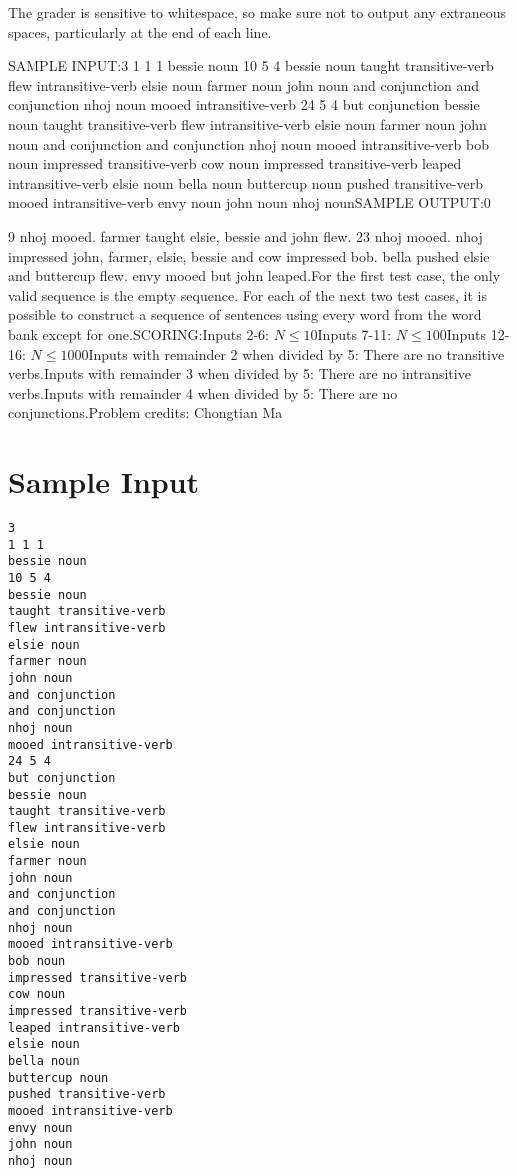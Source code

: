 \documentclass[12pt]{article}
\begin{document}
The grader is sensitive to whitespace, so make sure not to output any
extraneous spaces, particularly at the end of each line.

SAMPLE INPUT:3
1 1 1
bessie noun
10 5 4
bessie noun
taught transitive-verb
flew intransitive-verb
elsie noun
farmer noun
john noun
and conjunction
and conjunction
nhoj noun
mooed intransitive-verb
24 5 4
but conjunction
bessie noun
taught transitive-verb
flew intransitive-verb
elsie noun
farmer noun
john noun
and conjunction
and conjunction
nhoj noun
mooed intransitive-verb
bob noun
impressed transitive-verb
cow noun
impressed transitive-verb
leaped intransitive-verb
elsie noun
bella noun
buttercup noun
pushed transitive-verb
mooed intransitive-verb
envy noun
john noun
nhoj nounSAMPLE OUTPUT:0

9
nhoj mooed. farmer taught elsie, bessie and john flew.
23
nhoj mooed. nhoj impressed john, farmer, elsie, bessie and cow impressed bob. bella pushed elsie and buttercup flew. envy mooed but john leaped.For the first test case, the only valid sequence is the empty sequence. For each
of the next two test cases, it is possible to construct a sequence of sentences
using every word from the word bank except for one.SCORING:Inputs 2-6: $N\le 10$Inputs 7-11: $N\le 100$Inputs 12-16: $N\le 1000$Inputs with remainder 2 when divided by 5: There are no transitive
verbs.Inputs with remainder 3 when divided by 5: There are no intransitive
verbs.Inputs with remainder 4 when divided by 5: There are no conjunctions.Problem credits: Chongtian Ma

\section*{Sample Input}
\begin{verbatim}
3
1 1 1
bessie noun
10 5 4
bessie noun
taught transitive-verb
flew intransitive-verb
elsie noun
farmer noun
john noun
and conjunction
and conjunction
nhoj noun
mooed intransitive-verb
24 5 4
but conjunction
bessie noun
taught transitive-verb
flew intransitive-verb
elsie noun
farmer noun
john noun
and conjunction
and conjunction
nhoj noun
mooed intransitive-verb
bob noun
impressed transitive-verb
cow noun
impressed transitive-verb
leaped intransitive-verb
elsie noun
bella noun
buttercup noun
pushed transitive-verb
mooed intransitive-verb
envy noun
john noun
nhoj noun
\end{verbatim}
\end{document}
